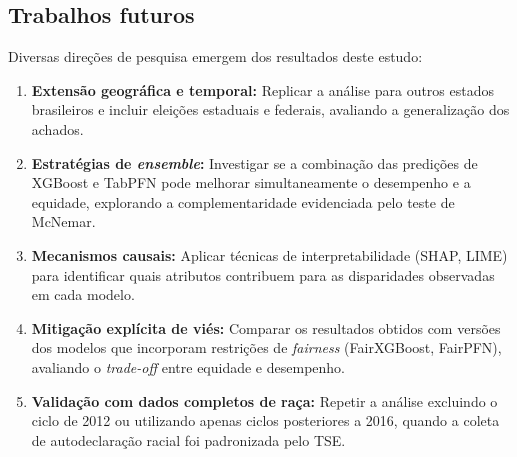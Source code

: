 \documentclass[12pt]{article}
\begin{document}
\subsection{Trabalhos futuros}

Diversas direções de pesquisa emergem dos resultados deste estudo:

\begin{enumerate}
  \item \textbf{Extensão geográfica e temporal:} Replicar a análise para outros estados brasileiros e incluir eleições estaduais e federais, avaliando a generalização dos achados.

  \item \textbf{Estratégias de \textit{ensemble}:} Investigar se a combinação das predições de XGBoost e TabPFN pode melhorar simultaneamente o desempenho e a equidade, explorando a complementaridade evidenciada pelo teste de McNemar.

  \item \textbf{Mecanismos causais:} Aplicar técnicas de interpretabilidade (SHAP, LIME) para identificar quais atributos contribuem para as disparidades observadas em cada modelo.

  \item \textbf{Mitigação explícita de viés:} Comparar os resultados obtidos com versões dos modelos que incorporam restrições de \textit{fairness} (FairXGBoost, FairPFN), avaliando o \textit{trade-off} entre equidade e desempenho.

  \item \textbf{Validação com dados completos de raça:} Repetir a análise excluindo o ciclo de 2012 ou utilizando apenas ciclos posteriores a 2016, quando a coleta de autodeclaração racial foi padronizada pelo TSE.
\end{enumerate}



\end{document}
